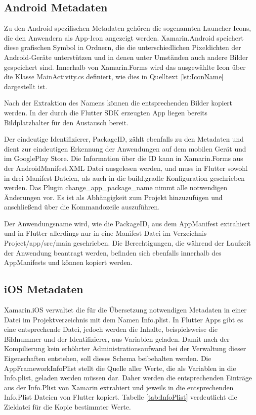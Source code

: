 \subsection{Android Metadaten}
Zu den Android spezifischen Metadaten gehören die sogenannten Launcher Icons, die den Anwendern als App-Icon angezeigt werden. Xamarin.Android speichert diese grafischen Symbol in Ordnern, die die unterschiedlichen Pixeldichten der Android-Geräte unterstützen und in denen unter Umständen auch andere Bilder gespeichert sind.  Innerhalb von Xamarin.Forms wird das ausgewählte Icon über die Klasse MainActivity.cs definiert, wie dies in Quelltext \ref{lst:IconName} dargestellt ist. 



Nach der Extraktion des Namens können die entsprechenden Bilder kopiert werden.  In der durch die Flutter SDK erzeugten App liegen bereits Bildplatzhalter für den Austausch bereit.

Der eindeutige Identifizierer,  PackageID,  zählt ebenfalls zu den Metadaten und dient zur eindeutigen Erkennung der Anwendungen auf dem mobilen Gerät und im GooglePlay Store.  Die Information über die ID kann in Xamarin.Forms aus der AndroidManifest.XML Datei ausgelesen werden, und muss in Flutter sowohl in drei Manifest Dateien,  als auch in die \glq build.gradle\grq{} Konfiguration geschrieben werden.  Das Plugin \glq change\_app\_package\_name\grq{}  nimmt alle notwendigen Änderungen vor.  Es ist als Abhängigkeit zum Projekt hinzuzufügen und anschließend über die Kommandozeile auszuführen. 

Der Anwendungsname wird, wie die PackageID,  aus dem AppManifest extrahiert und in Flutter allerdings nur in eine Manifest Datei im Verzeichnis Project/app/src/main\grq{} geschrieben.  Die Berechtigungen,  die während der Laufzeit der Anwendung beantragt werden,  befinden sich ebenfalls innerhalb des AppManifests und können kopiert werden.

\subsection{iOS Metadaten}
Xamarin.iOS verwaltet die für die Übersetzung notwendigen Metadaten in einer Datei im  Projektverzeichnis mit dem Namen Info.plist.  In Flutter Apps gibt es eine entsprechende Datei,  jedoch werden die Inhalte,  beispielsweise die Bildnummer und der Identifizierer,  aus Variablen geladen.  Damit nach der Kompilierung kein erhöhrter Administrationsaufwand bei der Verwaltung dieser Eigenschaften entstehen,  soll dieses Schema beibehalten werden.  Die AppFrameworkInfoPlist stellt die Quelle aller Werte,  die als Variablen in die Info.plist, geladen werden müssen dar.   Daher werden die entsprechenden Einträge aus der Info.Plist von Xamarin extrahiert und jeweils in die entsprechenden Info.Plist Dateien von Flutter kopiert.  Tabelle \ref{tab:InfoPlist} verdeutlicht die Zieldatei für die Kopie bestimmter Werte.


